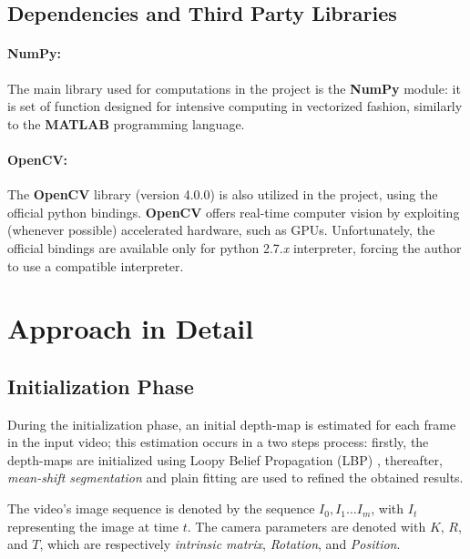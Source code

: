 \documentclass[notitlepage,english]{hgbreport}
\newcommand{\Acronym}[1]{{#1}}
\newcommand{\LBP}{\Acronym{LBP}}
\begin{document}
\subsection{Dependencies and Third Party Libraries}
\paragraph{NumPy:} The main library used for computations in the project is the \textbf{NumPy} module: it is set of function designed for intensive computing in vectorized fashion, similarly to the \textbf{MATLAB} programming language.

\paragraph{OpenCV:}
The \textbf{OpenCV} library (version 4.0.0) is also utilized in the project, using the official python bindings.
\textbf{OpenCV} offers real-time computer vision by exploiting (whenever possible) accelerated hardware, such as GPUs.
Unfortunately, the official bindings are available only for python 2.7.\textit{x} interpreter, forcing the author to use a compatible interpreter.




\section{Approach in Detail}
 
\subsection{Initialization Phase}
During the initialization phase, an initial depth-map is estimated for each frame in the input video; this estimation occurs in a two steps process: firstly, the depth-maps are initialized using Loopy Belief Propagation (\LBP) \cite{Felzenszwalb2006}, thereafter,  \emph{mean-shift segmentation} and plain fitting are used to refined the obtained results.

The video's image sequence is denoted by the sequence $I_0, I_1 ... I_m$, with $I_t$ representing the image at time $t$. The camera parameters are denoted with $K$, $R$, and $T$, which are respectively \emph{intrinsic matrix}, \emph{Rotation}, and \emph{Position}.
\end{document}
